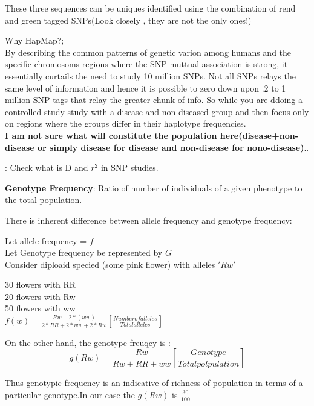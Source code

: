 \documentclass[a4paper]{article}
\begin{document}
These three sequences can be uniques identified using the combination of rend and green tagged SNPs(Look closely , they are not the only ones!)

Why HapMap?;\\
By describing the common patterns of genetic varion among humans and the specific chromosoms regions where the SNP muttual association is strong, it essentially curtails the need to study 10 million SNPs. Not all SNPs relays the same level of information and hence it is possible to zero down upon .2 to 1 million SNP tags that relay the greater chunk of info. So while you are ddoing a controlled study study with a disease and non-diseased group  and then focus only on regions where the groups differ in their haplotype frequencies. \\
{\color{blue}\textbf{I am not sure what will constitute the population here(disease+non-disease or simply disease for disease and non-disease for nono-disease)}}..

{\color{red}{TODO}: Check what is D and $r^2$ in SNP studies.}

\textbf{Genotype Frequency}: Ratio of number of individuals of a given phenotype to the total population.

There is inherent difference between allele frequency and genotype frequency:

Let  allele frequency = $f$ \\
Let Genotype frequency be represented by $G$ \\

Consider diploaid specied (some pink flower) with alleles $'Rw'$

30 flowers with RR\\
20 flowers with Rw\\
50 flowers with ww\\

\begin{math}
f(w) = \frac{Rw+2*(ww)}{2*RR+2*ww+2*Rw} [\frac{Number of  alleles}{Total alleles}]
\end{math}

On the other hand, the genotype freuqcy is :\\
\begin{equation}
g(Rw)=\frac{Rw}{Rw+RR+ww}[\frac{Genotype}{Total polpulation}]
\end{equation}

Thus genotypic frequency is an indicative of richness of population in terms of a particular genotype.In our case
the $g(Rw)$ is $\frac{30}{100}$
\end{document}

